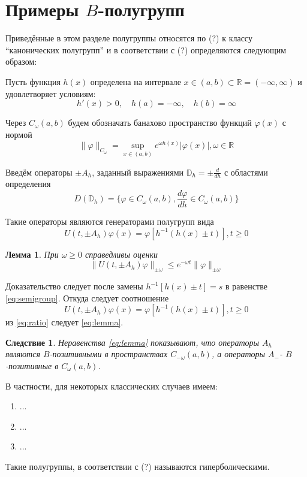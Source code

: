 \documentclass{article}
\newtheorem{lemma}{Лемма}
\newtheorem{corollary}{Следствие}[lemma]
\begin{document}
\section*{Примеры $B$-полугрупп}

Приведённые в этом разделе полугруппы относятся по (?) к классу ``канонических полугрупп'' и в соответствии
с (?) определяются следующим образом:

Пусть функция $h(x)$ определена на интервале $x \in (a, b) \subset \mathbb{R} = (-\infty, \infty)$
и удовлетворяет условиям:
\begin{equation*}
    h'(x) > 0, \quad h(a) = -\infty, \quad h(b) = \infty
\end{equation*}

Через $C_\omega (a, b)$ будем обозначать банахово пространство функций $\varphi (x)$ с нормой
\begin{equation}
    \|\varphi\|_{C_\omega} = \sup_{x \in (a, b)} e^{\omega h(x)} |\varphi(x)|, \omega \in \mathbb{R}
\end{equation}

Введём операторы $\pm A_h$, заданный выражениями $\mathbb{D}_h = \pm \frac{d}{dh}$ с областями определения
\begin{equation}
    D(\mathbb{D}_h) = \{\varphi \in C_\omega(a, b), \frac{d\varphi}{dh} \in C_\omega(a, b)\}
\end{equation}

Такие операторы являются генераторами полугрупп вида
\begin{equation}
    \label{eq:semigroup}
    U(t, \pm A_h)\varphi(x) = \varphi[h^{-1}(h(x) \pm t)], t \ge 0
\end{equation}

\begin{lemma}
    При $\omega \ge 0$ справедливы оценки
    \begin{equation}
        \label{eq:lemma}
        \|U(t, \pm A_h)\varphi\|_{\pm\omega} \le e^{-\omega t} \|\varphi\|_{\pm \omega}
    \end{equation}
\end{lemma}

Доказательство следует после замены $h^{-1}[h(x) \pm t] = s$ в равенстве \eqref{eq:semigroup}. Откуда
следует соотношение
\begin{equation}
    \label{eq:ratio}
    U(t, \pm A_h)\varphi(x) = \varphi[h^{-1}(h(x) \pm t)], t \ge 0
\end{equation}
из \eqref{eq:ratio} следует \eqref{eq:lemma}.

\begin{corollary}
        Неравенства \eqref{eq:lemma} показывают, что операторы $A_h$ являются $B$-позитивными
        в пространствах $C_{-\omega}(a, b)$, а операторы $A_{-}$- $B$-позитивные в $C_{\omega}(a, b)$.
\end{corollary}

В частности, для некоторых классических случаев имеем:
\begin{enumerate}
    \item ...
    \item ...
    \item ...
\end{enumerate}

Такие полугруппы, в соответствии с (?) называются гиперболическими.
\end{document}
